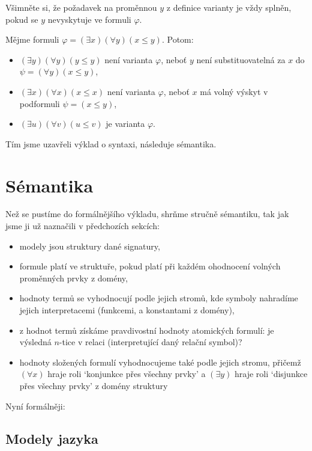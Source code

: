 Všimněte si, že požadavek na proměnnou $y$ z definice varianty je vždy splněn, pokud se $y$ nevyskytuje ve formuli $\varphi$.

\begin{example}
    Mějme formuli $\varphi=(\exists x)(\forall y)(x\leq y)$. Potom:
\begin{itemize}
    \item $(\exists y)(\forall y)(y\leq y)$ není varianta $\varphi$, neboť $y$ není substituovatelná za $x$ do $\psi=(\forall y)(x\leq y)$,
    \item $(\exists x)(\forall x)(x\leq x)$ není varianta $\varphi$, neboť $x$ má volný výskyt v podformuli $\psi=(x\leq y)$,
    \item $(\exists u)(\forall v)(u\leq v)$ je varianta $\varphi$.
\end{itemize}   
\end{example}

Tím jsme uzavřeli výklad o syntaxi, následuje sémantika.


\section{Sémantika}\label{section:predicate-semantics}

Než se pustíme do formálnějšího výkladu, shrňme stručně sémantiku, tak jak jsme ji už naznačili v předchozích sekcích: 

\begin{itemize}
    \item modely jsou struktury dané signatury,
    \item formule platí ve struktuře, pokud platí při každém ohodnocení volných proměnných prvky z domény,
    \item hodnoty termů se vyhodnocují podle jejich stromů, kde symboly nahradíme jejich interpretacemi (funkcemi, a konstantami z domény),
    \item z hodnot termů získáme pravdivostní hodnoty atomických formulí: je výsledná $n$-tice v relaci (interpretující daný relační symbol)?
    \item hodnoty složených formulí vyhodnocujeme také podle jejich stromu, přičemž $(\forall x)$ hraje roli `konjunkce přes všechny prvky' a  $(\exists y)$ hraje roli `disjunkce přes všechny prvky' z domény struktury
\end{itemize}

Nyní formálněji:

\subsection{Modely jazyka}

